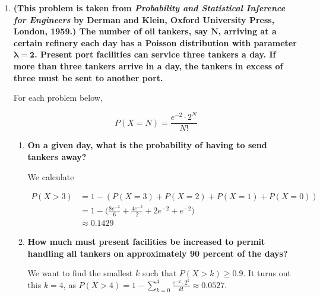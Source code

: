 \documentclass[10pt, oneside]{article}
\begin{document}
\begin{enumerate}[label=8.\arabic*]
This is consistent with the result of the maxima of the binomial distribution, which is expected since the Poisson distribution is the limiting case of the binomial for high $n$ and low $p$.

\item  \begin{tcolorbox}[
  colback=Cerulean!5!white,
  colframe=Cerulean!75!black]
\textbf{(This problem is taken from \textit{Probability and Statistical Inference for Engineers} by Derman and Klein, Oxford University Press, London, 1959.) The number of oil tankers, say $\bm{N}$, arriving at a certain refinery each day has a Poisson distribution with parameter $\bm{\lambda = 2}$. Present port facilities can service three tankers a day. If more than three tankers arrive in a day, the tankers in excess of three must be sent to another port.}
\end{tcolorbox}

For each problem below,

\[ P(X = N) = \frac{e^{-2} \cdot 2^N}{N!} \]

	\begin{enumerate}
	\item  \begin{tcolorbox}[
	  colback=Cerulean!5!white,
	  colframe=Cerulean!75!black]
	\textbf{On a given day, what is the probability of having to send tankers away?}
	\end{tcolorbox}
	
	We calculate
	
	\begin{align*}
	P(X > 3) &= 1 - (P(X = 3) + P(X = 2) + P(X = 1) + P(X = 0)) \\
	&= 1 - \Big( \frac{8e^{-2}}{6} + \frac{4 e^{-2}}{2} + 2e^{-2} + e^{-2} \Big) \\
	&\approx \boxed{0.1429}
	\end{align*}
	
	\item  \begin{tcolorbox}[
	  colback=Cerulean!5!white,
	  colframe=Cerulean!75!black]
	\textbf{How much must present facilities be increased to permit handling all tankers on approximately 90 percent of the days?}
	\end{tcolorbox}
	
	We want to find the smallest $k$ such that $P(X > k) \geq 0.9$. It turns out this $\boxed{k = 4}$, as $P(X > 4) = 1 - \sum^4_{k = 0} \frac{e^{-2} \cdot 2^k }{k!} \approx 0.0527$.
	

\end{enumerate}
\end{enumerate}
\end{document}
